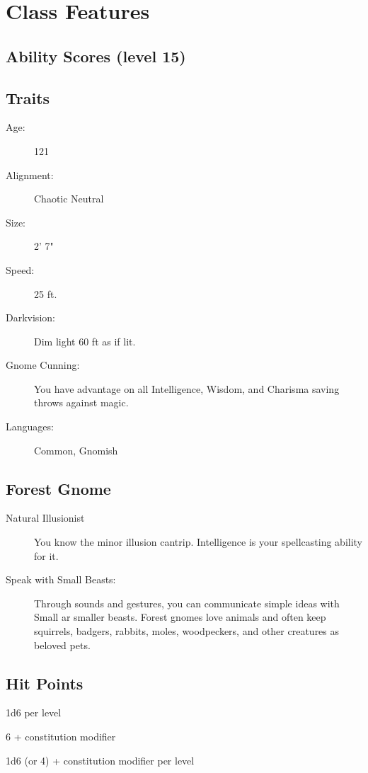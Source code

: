 \documentclass[letterpaper,10pt,twoside,twocolumn,openany]{book}
\begin{document}
\section{Class Features}

\subsection{Ability Scores (level 15)}
\stats[
STR = \stat{13},
DEX = \stat{14},
CON = \stat{16},
INT = \stat{16},
WIS = \stat{13},
CHA = \stat{20}
]

\subsection{Traits}
\begin{description}
	\item[Age:] 121
	\item[Alignment:] Chaotic Neutral
	\item[Size:] 2' 7"
	\item[Speed:] 25 ft.
	\item[Darkvision:] Dim light 60 ft as if lit.
	\item[Gnome Cunning:] You have advantage on all
	Intelligence, Wisdom, and Charisma saving throws
	against magic. 
	\item[Languages:] Common, Gnomish
\end{description}

\subsection{Forest Gnome}
\begin{description}
	\item[Natural Illusionist] You know the	minor illusion
	cantrip. Intelligence  is your spellcasting ability for it.
	\item[Speak with Small Beasts:] Through sounds and
	gestures, you can communicate simple ideas with Small
	ar smaller beasts. Forest gnomes love animals and often
	keep squirrels, badgers, rabbits, moles, woodpeckers,
	and other creatures as beloved pets.
\end{description}

\subsection{Hit Points}

\begin{description}[font=\normalfont\textbf,noitemsep,topsep=1ex,leftmargin=1em]
	\item[Hit Dice:] 1d6 per level
	\item[Hit Points at First Level:] 6 + constitution modifier
	\item[Hit Points at Higher levels:] 1d6 (or 4) + constitution modifier per level 
\end{description}
\end{document}
